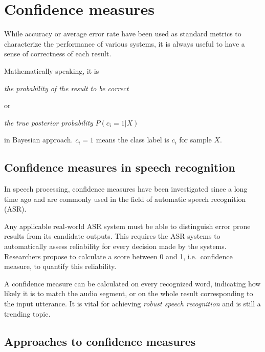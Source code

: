 \documentclass[11pt,a4paper]{report}
\begin{document}
\newpage

\section{Confidence measures}

While accuracy or average error rate have been used as standard metrics to characterize the performance of various systems, it is always useful to have a sense of correctness of each result.

\bigskip

Mathematically speaking, it is

\begin{center}
  \textit{the probability of the result to be correct}
\end{center}

or

\begin{center}
  \textit{the true posterior probability} \(P (c_i = 1 | X)\)
\end{center}

in Bayesian approach.
\(c_i = 1\) means the class label is \(c_i\) for sample \(X\).

\subsection{Confidence measures in speech recognition}

In speech processing, confidence measures have been investigated since a long time ago and are commonly used in the field of automatic speech recognition (ASR).

Any applicable real-world ASR system must be able to distinguish error prone results from its candidate outputs.
This requires the ASR systems to automatically assess reliability for every decision made by the systems.
Researchers propose to calculate a score between 0 and 1, i.e.\, confidence measure, to quantify this reliability.

A confidence measure can be calculated on every recognized word, indicating how likely it is to match the audio segment, or on the whole result corresponding to the input utterance.
It is vital for achieving \emph{robust speech recognition} and is still a trending topic.

\subsection{Approaches to confidence measures}
\end{document}
